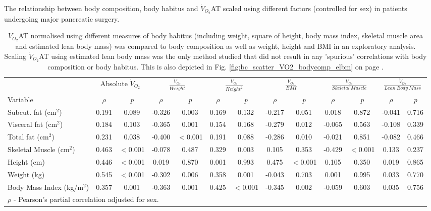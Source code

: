 \begin{sidewaystable}[p]
	\caption{The relationship between body composition, body habitus and $\dot{V}_{O_2}$AT scaled using different factors (controlled for sex) in patients undergoing major pancreatic surgery.}
	\label{table:bc_at_new_indices}
	\footnotesize
	\centering
	\renewcommand{\arraystretch}{1.5} %
	\begin{tabular}{|l|cc|cc|cc|cc|cc|cc|}
		\hline
		& \multicolumn{2}{c|}{Absolute $\dot{V}_{O_2}$} & \multicolumn{2}{c|}{$\frac{\dot{V}_{O_2}}{Weight}$} & \multicolumn{2}{c|}{$\frac{\dot{V}_{O_2}}{Height^2}$} & \multicolumn{2}{c|}{$\frac{\dot{V}_{O_2}}{BMI}$} & \multicolumn{2}{c|}{$\frac{\dot{V}_{O_2}}{Skeletal\ Muscle}$}  & \multicolumn{2}{c|}{$\frac{\dot{V}_{O_2}}{Lean\ Body\ Mass}$}\\
		
		Variable              	& $\rho$ &\textit{p}& $\rho$ &\textit{p}& $\rho$ &\textit{p}& $\rho$ &\textit{p}& $\rho$ &\textit{p}& $\rho$ &\textit{p} \\ \hline
		Subcut. fat (cm$^2$)     & 0.191  &  0.089   & -0.326 &  0.003   & 0.169  &  0.132   & -0.217 &  0.051   & 0.018  &  0.872   & -0.041 & 0.716 \\
		Visceral fat (cm$^2$)    & 0.184  &  0.103   & -0.365 &  0.001   & 0.154  &  0.168   & -0.279 &  0.012   & -0.065 &  0.563   & -0.108 & 0.339\\
		Total fat (cm$^2$)       & 0.231  &  0.038   & -0.400 & $<$0.001 & 0.191  &  0.088   & -0.286 &  0.010   & -0.021 &  0.851   & -0.082 & 0.466\\
		Skeletal Muscle (cm$^2$) & 0.463  & $<$0.001 & -0.078 &  0.487   & 0.329  &  0.003   & 0.105  &  0.353   & -0.429 & $<$0.001 & 0.133 & 0.237 \\
		Height (cm)               & 0.446  & $<$0.001 & 0.019  &  0.870   & 0.001  &  0.993   & 0.475  & $<$0.001 & 0.105  &  0.350   & 0.019 & 0.865\\
		Weight (kg)               & 0.545  & $<$0.001 & -0.302 &  0.006   & 0.358  &  0.001   & -0.043 &  0.703   & 0.001  &  0.995   & 0.033 & 0.770\\
		Body Mass Index (kg/m$^2$)      & 0.357  &  0.001   & -0.363 &  0.001   & 0.425  & $<$0.001 & -0.345 &  0.002   & -0.059 &  0.603   & 0.035 & 0.756\\ \hline
		\multicolumn{11}{l}{$\rho$ - Pearson's partial correlation adjusted for sex.}
	\end{tabular}
	\medskip
	\caption*{$\dot{V}_{O_2}$AT normalised using different measures of body habitus (including weight, square of height, body mass index, skeletal muscle area and estimated lean body mass) was compared to body composition as well as weight, height and BMI in an exploratory analysis. Scaling $\dot{V}_{O_2}$AT using estimated lean body mass was the only method studied that did not result in any 'spurious' correlations with body composition or body habitus. This is also depicted in Fig. \ref{fig:bc_scatter_VO2_bodycomp_elbm} on page \pageref{fig:bc_scatter_VO2_bodycomp_elbm}.}
\end{sidewaystable}


